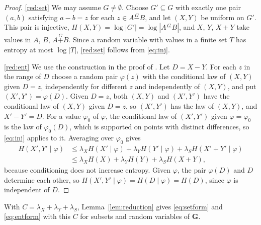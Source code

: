 \documentclass[11pt]{amsart}
\theoremstyle{definition}
\theoremstyle{remark}
\numberwithin{equation}{section}
\newcommand{\GG}{\mathbf{G}}
\newcommand{\gp}{\mathbin{\overset{G}{+}}}
\newcommand{\gm}{\mathbin{\overset{G}{-}}}
\begin{document}
\begin{proof}
\ref{red:set} We may assume $G\ne\emptyset$. Choose $G'\subseteq G$ with exactly one pair $(a,b)$ satisfying $a-b=z$ for each $z\in A\gm B$, and let $(X,Y)$ be uniform on $G'$. This pair is injective, $H(X,Y)=\log|G'|=\log|A\gm B|$, and $X$, $Y$, $X+Y$ take values in $A$, $B$, $A\gp B$. Since a random variable with values in a finite set $T$ has entropy at most $\log|T|$, \ref{red:set} follows from \eqref{eq:inj}.

\ref{red:ent} We use the construction in the proof of \cite[Proposition~3.6]{Tao25}. Let $D=X-Y$. For each $z$ in the range of $D$ choose a random pair $\varphi(z)$ with the conditional law of $(X,Y)$ given $D=z$, independently for different $z$ and independently of $(X,Y)$, and put $(X',Y')=\varphi(D)$. Given $D=z$, both $(X,Y)$ and $(X',Y')$ have the conditional law of $(X,Y)$ given $D=z$, so $(X',Y')$ has the law of $(X,Y)$, and $X'-Y'=D$. For a value $\varphi_0$ of $\varphi$, the conditional law of $(X',Y')$ given $\varphi=\varphi_0$ is the law of $\varphi_0(D)$, which is supported on points with distinct differences, so \eqref{eq:inj} applies to it. Averaging over $\varphi_0$ gives
\begin{align*}
H(X',Y'\mid\varphi)&\le\lambda_XH(X'\mid\varphi)+\lambda_YH(Y'\mid\varphi)+\lambda_SH(X'+Y'\mid\varphi)\\
&\le\lambda_XH(X)+\lambda_YH(Y)+\lambda_SH(X+Y),
\end{align*}
because conditioning does not increase entropy. Given $\varphi$, the pair $\varphi(D)$ and $D$ determine each other, so $H(X',Y'\mid\varphi)=H(D\mid\varphi)=H(D)$, since $\varphi$ is independent of $D$.
\end{proof}

With $C=\lambda_X+\lambda_Y+\lambda_S$, Lemma~\ref{lem:reduction} gives \eqref{eq:setform} and \eqref{eq:entform} with this $C$ for subsets and random variables of $\GG$.
\end{document}
